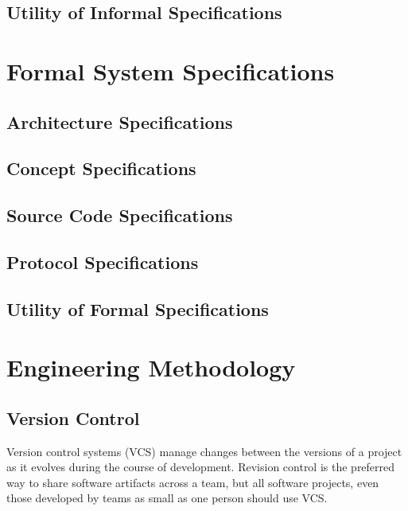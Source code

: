 \subsection{Utility of Informal Specifications}

\section{Formal System Specifications}

\subsection{Architecture Specifications}

\subsection{Concept Specifications}

\subsection{Source Code Specifications}

\subsection{Protocol Specifications}

\subsection{Utility of Formal Specifications}

\section{Engineering Methodology}



\subsection{Version Control}

Version control systems (VCS) manage changes between the versions of a
project as it evolves during the course of development. Revision
control is the preferred way to share software artifacts across a
team, but all software projects, even those developed by teams as
small as one person should use VCS.

